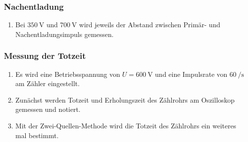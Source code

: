 \subsubsection{Nachentladung}
\begin{enumerate}
  \item Bei $\SI{350}{\volt}$ und $\SI{700}{\volt}$ wird jeweils der Abstand
  zwischen Primär- und Nachentladungsimpuls gemessen.
\end{enumerate}

\subsubsection{Messung der Totzeit}
\begin{enumerate}
  \item Es wird eine Betriebsspannung von $U = \SI{600}{\volt}$ und
  eine Impulsrate von $\SI{60}{\per\second}$ am Zähler eingestellt.
  \item Zunächst werden Totzeit und Erholungszeit des Zählrohrs am Oszilloskop
  gemessen und notiert.
  \item Mit der Zwei-Quellen-Methode wird die Totzeit des Zählrohrs ein weiteres
  mal bestimmt.
\end{enumerate}
